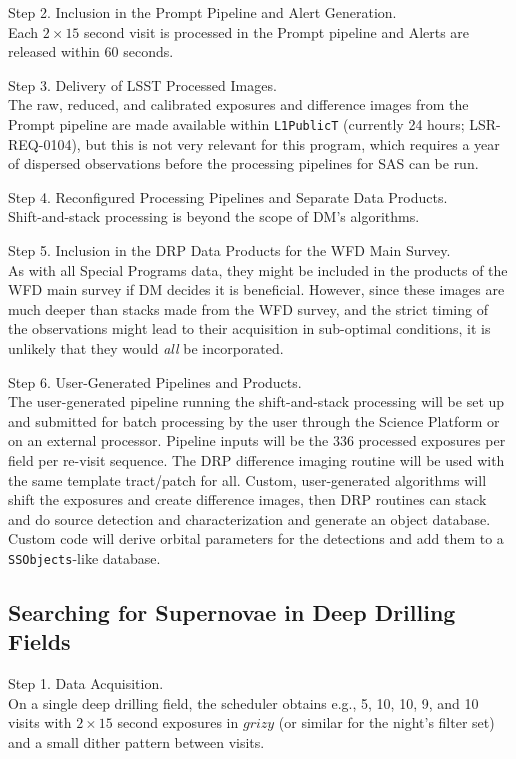 \documentclass[DM,lsstdoc,toc]{lsstdoc}
\begin{document}
Step 2. Inclusion in the Prompt Pipeline and Alert Generation. \\
Each $2\times15$ second visit is processed in the Prompt pipeline and Alerts are released within 60 seconds.

Step 3. Delivery of LSST Processed Images. \\
The raw, reduced, and calibrated exposures and difference images from the Prompt pipeline are made available within \texttt{L1PublicT} (currently 24 hours; LSR-REQ-0104), but this is not very relevant for this program, which requires a year of dispersed observations before the processing pipelines for SAS can be run.

Step 4. Reconfigured Processing Pipelines and Separate Data Products. \\
Shift-and-stack processing is beyond the scope of DM's algorithms.

Step 5. Inclusion in the DRP Data Products for the WFD Main Survey. \\
As with all Special Programs data, they might be included in the products of the WFD main survey if DM decides it is beneficial. However, since these images are much deeper than stacks made from the WFD survey, and the strict timing of the observations might lead to their acquisition in sub-optimal conditions, it is unlikely that they would \textit{all} be incorporated.

Step 6. User-Generated Pipelines and Products. \\
The user-generated pipeline running the shift-and-stack processing will be set up and submitted for batch processing by the user through the Science Platform or on an external processor. Pipeline inputs will be the 336 processed exposures per field per re-visit sequence. The DRP difference imaging routine will be used with the same template tract/patch for all. Custom, user-generated algorithms will shift the exposures and create difference images, then DRP routines can stack and do source detection and characterization and generate an object database. Custom code will derive orbital parameters for the detections and add them to a {\tt SSObjects}-like database.


\subsection{Searching for Supernovae in Deep Drilling Fields}\label{ssec:SPCS_SNDDF}

Step 1. Data Acquisition. \\
On a single deep drilling field, the scheduler obtains e.g., 5, 10, 10, 9, and 10 visits with $2\times15$ second exposures in $grizy$ (or similar for the night's filter set) and a small dither pattern between visits.
\end{document}
